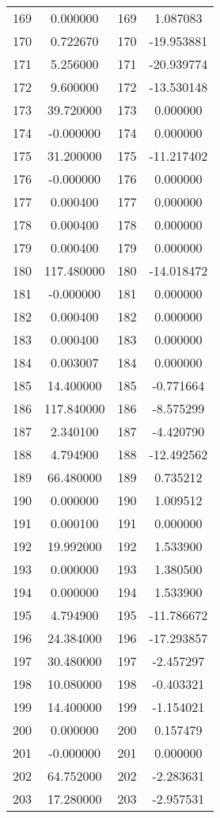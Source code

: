 \documentclass[12pt]{article}
\begin{document}
\begin{longtable}{@{}cccc@{}}
169 & 0.000000 & 169 & 1.087083 \\
170 & 0.722670 & 170 & -19.953881 \\
171 & 5.256000 & 171 & -20.939774 \\
172 & 9.600000 & 172 & -13.530148 \\
173 & 39.720000 & 173 & 0.000000 \\
174 & -0.000000 & 174 & 0.000000 \\
175 & 31.200000 & 175 & -11.217402 \\
176 & -0.000000 & 176 & 0.000000 \\
177 & 0.000400 & 177 & 0.000000 \\
178 & 0.000400 & 178 & 0.000000 \\
179 & 0.000400 & 179 & 0.000000 \\
180 & 117.480000 & 180 & -14.018472 \\
181 & -0.000000 & 181 & 0.000000 \\
182 & 0.000400 & 182 & 0.000000 \\
183 & 0.000400 & 183 & 0.000000 \\
184 & 0.003007 & 184 & 0.000000 \\
185 & 14.400000 & 185 & -0.771664 \\
186 & 117.840000 & 186 & -8.575299 \\
187 & 2.340100 & 187 & -4.420790 \\
188 & 4.794900 & 188 & -12.492562 \\
189 & 66.480000 & 189 & 0.735212 \\
190 & 0.000000 & 190 & 1.009512 \\
191 & 0.000100 & 191 & 0.000000 \\
192 & 19.992000 & 192 & 1.533900 \\
193 & 0.000000 & 193 & 1.380500 \\
194 & 0.000000 & 194 & 1.533900 \\
195 & 4.794900 & 195 & -11.786672 \\
196 & 24.384000 & 196 & -17.293857 \\
197 & 30.480000 & 197 & -2.457297 \\
198 & 10.080000 & 198 & -0.403321 \\
199 & 14.400000 & 199 & -1.154021 \\
200 & 0.000000 & 200 & 0.157479 \\
201 & -0.000000 & 201 & 0.000000 \\
202 & 64.752000 & 202 & -2.283631 \\
203 & 17.280000 & 203 & -2.957531 \\

\end{longtable}
\end{document}
